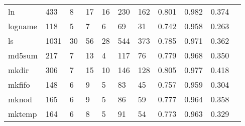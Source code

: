 \begin{longtable}{lp{1.10cm}p{1.10cm}p{1.10cm}p{1.10cm}p{1.10cm}p{1.10cm}p{1.10cm}p{1.10cm}p{1.10cm}p{1.10cm}}
ln        &                    433 &                                  8 &                                17 &                               16 &                               230 &                             162 &                             0.801 &                                 0.982 &                               0.374 \\
logname   &                    118 &                                  5 &                                 7 &                                6 &                                69 &                              31 &                             0.742 &                                 0.958 &                               0.263 \\
ls        &                   1031 &                                 30 &                                56 &                               28 &                               544 &                             373 &                             0.785 &                                 0.971 &                               0.362 \\
md5sum    &                    217 &                                  7 &                                13 &                                4 &                               117 &                              76 &                             0.779 &                                 0.968 &                               0.350 \\
mkdir     &                    306 &                                  7 &                                15 &                               10 &                               146 &                             128 &                             0.805 &                                 0.977 &                               0.418 \\
mkfifo    &                    148 &                                  6 &                                 9 &                                5 &                                83 &                              45 &                             0.757 &                                 0.959 &                               0.304 \\
mknod     &                    165 &                                  6 &                                 9 &                                5 &                                86 &                              59 &                             0.777 &                                 0.964 &                               0.358 \\
mktemp    &                    164 &                                  6 &                                 8 &                                5 &                                91 &                              54 &                             0.773 &                                 0.963 &                               0.329 \\

\end{longtable}
